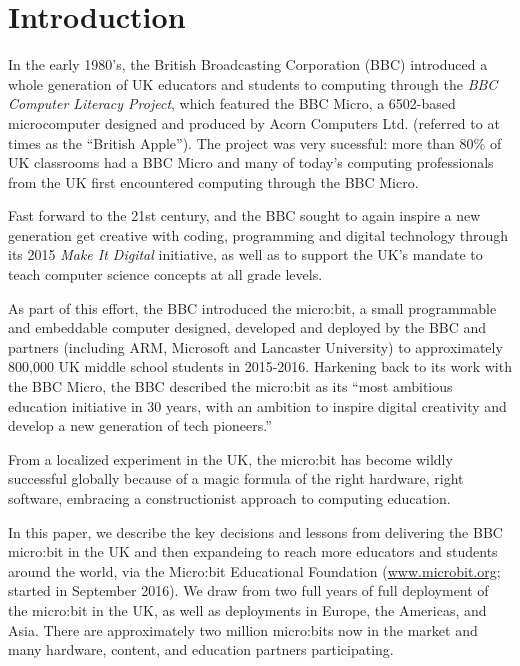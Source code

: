 \section{Introduction}
\label{sec:intrp}

In the early 1980's, the British Broadcasting Corporation (BBC)
introduced a whole generation of UK educators and students to computing
through the {\em BBC Computer Literacy Project}, which featured the BBC Micro, 
a 6502-based microcomputer designed and produced by Acorn Computers Ltd. (referred
to at times as the ``British Apple'').  The project was very sucessful:
more than 80\% of UK classrooms had a BBC Micro and many of today's 
computing professionals from the UK first encountered computing through
the BBC Micro.

Fast forward to the 21st century, and the BBC sought to again inspire a new
generation get creative with coding, programming and digital technology
through its 2015 {\em Make It Digital} initiative, as well as to support the UK's mandate to 
teach computer science concepts at all grade levels.~\cite{PeytonJones2013ICFP}

As part of this effort, the BBC introduced the micro:bit,
a small programmable and embeddable computer designed, 
developed and deployed by the BBC and partners (including ARM, Microsoft
and Lancaster University) to approximately 800,000 UK middle school students
in 2015-2016. Harkening back to its work with the BBC Micro,
the BBC described the micro:bit as its ``most ambitious education initiative in 30 years, 
with an ambition to inspire digital creativity and 
develop a new generation of tech pioneers.''~\cite{BBCwebsite}

From a localized experiment in the UK, the micro:bit has become
wildly successful globally because of a magic formula of the right hardware, 
right software, embracing a constructionist approach to computing education.

In this paper, we describe the key decisions and lessons from
delivering the BBC micro:bit in the UK and then expandeing to reach 
more educators and students around the world, via the Micro:bit Educational
Foundation (\url{www.microbit.org}; started in September 2016). 
We draw from two full years of 
full deployment of the micro:bit in the UK, as well as deployments
in Europe, the Americas, and Asia.  There are approximately
two million micro:bits now in the market and many hardware,
content, and education partners participating. 



